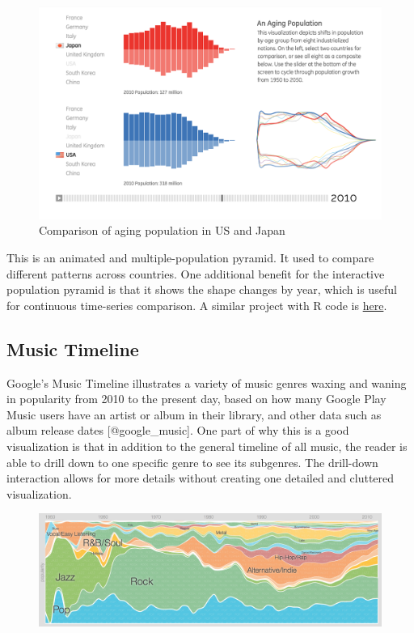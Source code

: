 \documentclass[]{book}
\theoremstyle{definition}
\theoremstyle{definition}
\theoremstyle{definition}
\theoremstyle{remark}
\begin{document}
\begin{figure}
\centering
\includegraphics{images/3_1.png}
\caption{Comparison of aging population in US and Japan}
\end{figure}

This is an animated and multiple-population pyramid. It used to compare
different patterns across countries. One additional benefit for the
interactive population pyramid is that it shows the shape changes by
year, which is useful for continuous time-series comparison. A similar
project with R code is
\href{https://www.r-bloggers.com/who-is-old-visualizing-the-concept-of-prospective-ageing-with-animated-population-pyramids/}{here}.

\subsection{Music Timeline}\label{music-timeline}

Google's Music Timeline illustrates a variety of music genres waxing and
waning in popularity from 2010 to the present day, based on how many
Google Play Music users have an artist or album in their library, and
other data such as album release dates {[}@google\_music{]}. One part of
why this is a good visualization is that in addition to the general
timeline of all music, the reader is able to drill down to one specific
genre to see its subgenres. The drill-down interaction allows for more
details without creating one detailed and cluttered visualization.

\begin{figure}
\centering
\includegraphics{images/music_timeline.png}
\caption{}
\end{figure}
\end{document}
